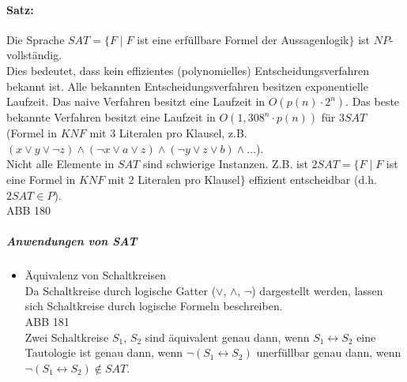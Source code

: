 \paragraph{Satz:} Die Sprache $SAT=\{F\;|\; F$ ist eine erfüllbare Formel der Aussagenlogik$\}$ ist $NP$-vollständig.\\
Dies bedeutet, dass kein effizientes (polynomielles) Entscheidungsverfahren bekannt ist. Alle bekannten Entscheidungsverfahren besitzen exponentielle Laufzeit. Das naive Verfahren besitzt eine Laufzeit in $O(p(n)\cdot 2^n)$. Das beste bekannte Verfahren besitzt eine Laufzeit in $O(1,308^n\cdot p(n))$ für $3 SAT$ (Formel in $KNF$ mit 3 Literalen pro Klausel, z.B. $(x\vee y \vee \neg z ) \wedge (\neg x \vee a \vee z) \wedge (\neg y \vee z \vee b) \wedge \dots$).\\
Nicht alle Elemente in $SAT$ sind schwierige Instanzen. Z.B. ist $2 SAT=\{F\;|\; F$ ist eine Formel in $KNF$ mit 2 Literalen pro Klausel$\}$ effizient entscheidbar (d.h. $2 SAT \in P$).\\
ABB 180
\subparagraph{Anwendungen von SAT} 
\begin{itemize}
\item Äquivalenz von Schaltkreisen\\
Da Schaltkreise durch logische Gatter ($\vee$, $\wedge$, $\neg$) dargestellt werden, lassen sich Schaltkreise durch logische Formeln beschreiben.\\
ABB 181\\
Zwei Schaltkreise $S_1$, $S_2$ sind äquivalent genau dann, wenn $S_1\leftrightarrow S_2$ eine Tautologie ist genau dann, wenn $\neg(S_1 \leftrightarrow S_2)$ unerfüllbar genau dann, wenn $\neg (S_1\leftrightarrow S_2) \not \in SAT$.
\end{itemize}
\newpage
\printbibliography

